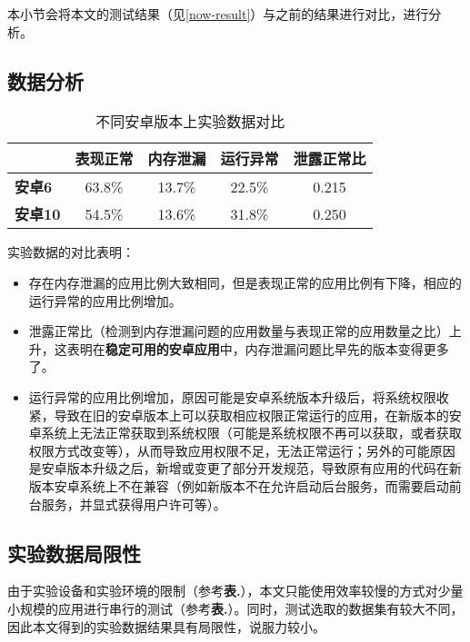 本小节会将本文的测试结果（见\ref{now-result}）与之前的结果\cite{jun2018lesdroid}进行对比，进行分析。

\subsection{数据分析}
\begin{table}[htb]\footnotesize
	\centering
	\caption{不同安卓版本上实验数据对比}
	\vspace{2mm}
	\begin{tabular}{lcccc}
		\toprule
		&\textbf{表现正常}&\textbf{内存泄漏}&\textbf{运行异常}&\textbf{泄露正常比}\\
		\midrule
		\textbf{安卓6}&63.8\%&13.7\%&22.5\%&0.215\\
		\hline
		\textbf{安卓10}&54.5\%&13.6\%&31.8\%&0.250\\
		\bottomrule
	\end{tabular}
	\label{table:compare}
\end{table}

实验数据的对比表明：
\begin{itemize}
	\item 存在内存泄漏的应用比例大致相同，但是表现正常的应用比例有下降，相应的运行异常的应用比例增加。
	\item 泄露正常比（检测到内存泄漏问题的应用数量与表现正常的应用数量之比）上升，这表明在\textbf{稳定可用的安卓应用}中，内存泄漏问题比早先的版本变得更多了。
	\item 运行异常的应用比例增加，原因可能是安卓系统版本升级后，将系统权限收紧，导致在旧的安卓版本上可以获取相应权限正常运行的应用，在新版本的安卓系统上无法正常获取到系统权限（可能是系统权限不再可以获取，或者获取权限方式改变等），从而导致应用权限不足，无法正常运行；另外的可能原因是安卓版本升级之后，新增或变更了部分开发规范，导致原有应用的代码在新版本安卓系统上不在兼容（例如新版本不在允许启动后台服务，而需要启动前台服务，并显式获得用户许可等）。
\end{itemize}

\subsection{实验数据局限性}

由于实验设备和实验环境的限制（参考\textbf{表.}\redbf{\ref{table:pc-compare}}），本文只能使用效率较慢的方式对少量小规模的应用进行串行的测试（参考\textbf{表.}\redbf{\ref{table:method-compare}}）。同时，测试选取的数据集有较大不同，因此本文得到的实验数据结果具有局限性，说服力较小。
\newline

